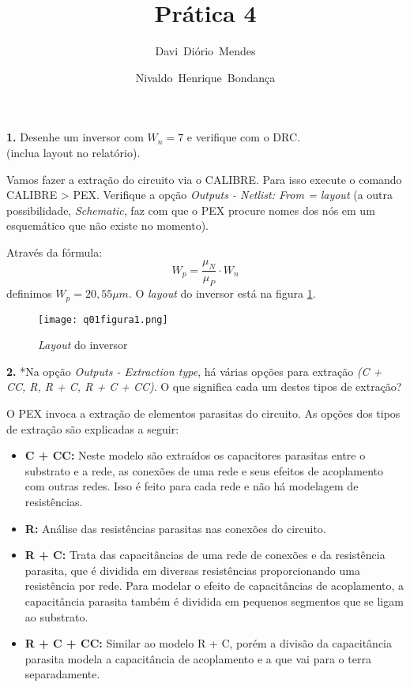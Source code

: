 \documentclass[10pt, a4paper, titlepage]{article}
\title{Prática 4}
\author{Davi~Diório~Mendes \and Nivaldo~Henrique~Bondança}
\begin{document}
\maketitle

\listoffigures
\newpage

\lstlistoflistings
\newpage


\textbf{1.} Desenhe um inversor com $W_n = 7$ e verifique com o DRC.\\
        (inclua layout no relatório).

Vamos fazer a extração do circuito via o CALIBRE. Para isso execute o comando CALIBRE > PEX. Verifique a opção \emph{Outputs - Netlist: From = layout} (a outra possibilidade, \emph{Schematic}, faz com que o PEX procure nomes dos nós em um esquemático que não existe no momento).

Através da fórmula:
\begin{equation}
    W_p = \frac{\mu_N}{\mu_P} \cdot W_n
\end{equation}
definimos $W_p = 20,55 \mu m$. O \emph{layout} do inversor está na figura \ref{figInversorQ1}.
\begin{figure}[!hb]
    \centering
    \texttt{[image: q01figura1.png]}
    \caption{\emph{Layout} do inversor}
    \label{figInversorQ1}
\end{figure}

\textbf{2.} *Na opção \emph{Outputs - Extraction type}, há várias opções para extração \emph{(C + CC, R, R + C, R + C + CC)}. O que significa cada um destes tipos de extração?

O PEX invoca a extração de elementos parasitas do circuito. As opções dos tipos de extração são explicadas a seguir:
\begin{itemize}
    \item \textbf{C + CC:} Neste modelo são extraídos os capacitores parasitas entre o substrato e a rede, as conexões de uma rede e seus efeitos de acoplamento com outras redes. Isso é feito para cada rede e não há modelagem de resistências.
    \item \textbf{R:} Análise das resistências parasitas nas conexões do circuito.
    \item \textbf{R + C:} Trata das capacitâncias de uma rede de conexões e da resistência parasita, que é dividida em diversas resistências proporcionando uma resistência por rede. Para modelar o efeito de capacitâncias de acoplamento, a capacitância parasita também é dividida em pequenos segmentos que se ligam ao substrato.
    \item \textbf{R + C + CC:} Similar ao modelo R + C, porém a divisão da capacitância parasita modela a capacitância de acoplamento e a que vai para o terra separadamente.
\end{itemize}
\end{document}
